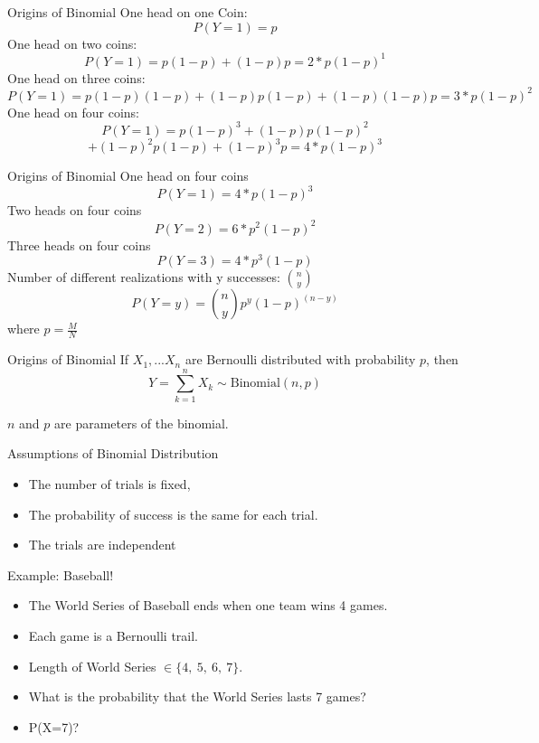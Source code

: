 \documentclass[handout]{beamer}
\numberwithin{equation}{section}
\begin{document}
\begin{frame}{Origins of Binomial}
One head on one Coin:
$$P(Y=1)=p$$
One head on two coins:\pause
$$P(Y=1)=p(1-p)+(1-p)p=2*p(1-p)^{1}$$
One head on three coins:\pause
$$P(Y=1)=p(1-p)(1-p)+(1-p)p(1-p)+(1-p)(1-p)p=3*p(1-p)^{2}$$
One head on four coins:\pause
$$P(Y=1)=p(1-p)^3+(1-p)p(1-p)^2$$
$$+(1-p)^2p(1-p)+(1-p)^3p=4*p(1-p)^{3}$$

\end{frame}

\begin{frame}{Origins of Binomial}
One head on four coins
$$P(Y=1)=4*p(1-p)^{3}$$
Two heads on four coins\pause
$$P(Y=2)= 6*p^2(1-p)^{2}$$
Three heads on four coins\pause
$$P(Y=3)=4*p^3(1-p)$$
Number of different realizations with y successes: ${n \choose y}$
$$P(Y=y)={n\choose y} p^y(1-p)^{(n-y)}$$
where $p=\frac{M}{N}$

\end{frame}


\begin{frame}{Origins of Binomial}
If $X_1, ... X_n$ are Bernoulli distributed with probability $p$, then
$$Y=\sum_{k=1}^nX_k \sim \text{Binomial}(n, p)$$

$n$ and $p$ are parameters of the binomial.
\end{frame}



\begin{frame}{Assumptions of Binomial Distribution}
\begin{itemize}
\item The number of trials is fixed,
\item The probability of success is the same for each trial.
\item The trials are independent
\end{itemize}
\end{frame}

\begin{frame}{Example: Baseball!}
\begin{itemize}
\item The World Series of Baseball ends when one team wins 4 games.
\item Each game is a Bernoulli trail.\pause
\item Length of World Series $\in\{4,\ 5,\ 6,\ 7\}$.
\item What is the probability that the World Series lasts 7 games? \pause
\item P(X=7)?
\end{itemize}
\end{frame}
\end{document}
